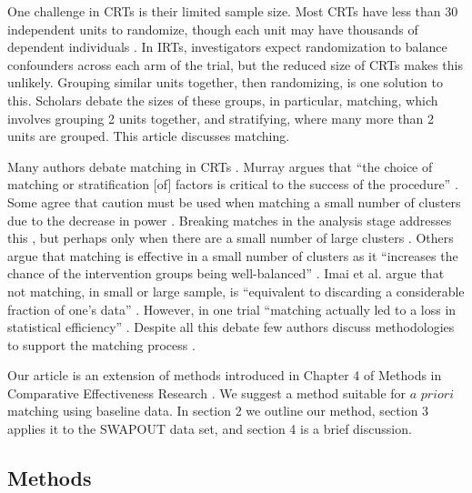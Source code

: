 \documentclass[]{sagej}
\begin{document}
One challenge in CRTs is their limited sample size. Most CRTs have less
than 30 independent units to randomize, though each unit may have
thousands of dependent individuals \citep{balzer2012match}. In IRTs,
investigators expect randomization to balance confounders across each
arm of the trial, but the reduced size of CRTs makes this unlikely.
Grouping similar units together, then randomizing, is one solution to
this. Scholars debate the sizes of these groups, in particular,
matching, which involves grouping 2 units together, and stratifying,
where many more than 2 units are grouped\citep{PMVsStrat}. This article
discusses matching.

Many authors debate matching in CRTs
\citep{balzer2012match, CRTrials2009, gatsonis2017methods, diehr1995breaking, murray1998design, imai2009essential, PMVsStrat, donner2007merits, klar1997merits, donner2000design, martin1993effect}.
Murray argues that ``the choice of matching or stratification {[}of{]}
factors is critical to the success of the procedure''
\citep{murray1998design}. Some agree that caution must be used when
matching a small number of clusters due to the decrease in power
\citep{donner2000design, klar1997merits, balzer2012match, martin1993effect}.
Breaking matches in the analysis stage addresses this
\citep{diehr1995breaking}, but perhaps only when there are a small
number of large clusters \citep{donner2007merits}. Others argue that
matching is effective in a small number of clusters as it ``increases
the chance of the intervention groups being well-balanced''
\citep{donner2007merits}. Imai et al. argue that not matching, in small
or large sample, is ``equivalent to discarding a considerable fraction
of one's data'' \citep{imai2009essential}. However, in one trial
``matching actually led to a loss in statistical efficiency''
\citep[\citet{donner2000design}]{manun1994influence}. Despite all this
debate few authors discuss methodologies to support the matching process
\citep{raab2001balance}.

Our article is an extension of methods introduced in Chapter 4 of
Methods in Comparative Effectiveness Research
\citep{gatsonis2017methods}. We suggest a method suitable for \(a\)
\(priori\) matching using baseline data. In section 2 we outline our
method, section 3 applies it to the SWAPOUT data set, and section 4 is a
brief discussion.

\subsection{Methods }\label{methods}
\end{document}

